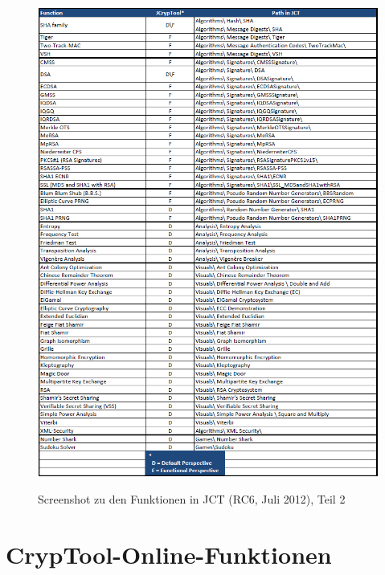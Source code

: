 \clearpage
\begin{figure}[hb]
\begin{center}
\vspace{-30pt}
\includegraphics[scale=0.8, angle=0] {figures/JCT-functions-de-2}
\hypertarget{functions-overview-2-JCT}{}
\caption{Screenshot zu den Funktionen in JCT (RC6, Juli 2012), Teil 2}
\label{functions-overview-2-JCT}
\end{center}
\end{figure}
\clearpage





\newpage
\hypertarget{appendix-function-overview-CTO}{}
\section{CrypTool-Online-Funktionen}
\label{s:appendix-function-overview-CTO}

